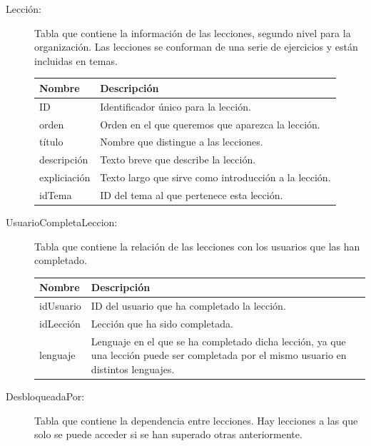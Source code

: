 \begin{description}
\item[Lección:] Tabla que contiene la información de las lecciones, segundo nivel para la organización. Las lecciones se conforman de una serie de ejercicios y están incluidas en temas.

\begin{tabularx}{14cm}{|l|X|}
\hline
\textbf{Nombre} & \textbf{Descripción}                                                              \\ \hline
ID              & Identificador único para la lección.                                         \\ \hline
orden        & Orden en el que queremos que aparezca la lección. \\ \hline
título      & Nombre que distingue a las lecciones. \\ \hline
descripción              & Texto breve que describe la lección.                                         \\ \hline
expliciación        & Texto largo que sirve como introducción a la lección.  \\ \hline
idTema      & ID del tema al que pertenece esta lección. \\ \hline
\end{tabularx}

\item[UsuarioCompletaLeccion:] Tabla que contiene la relación de las lecciones con los usuarios que las han completado.

\begin{tabularx}{14cm}{|l|X|}
\hline
\textbf{Nombre} & \textbf{Descripción}                                                              \\ \hline
idUsuario       & ID del usuario que ha completado la lección.                                                          \\ \hline
idLección     & Lección que ha sido completada.                                           \\ \hline
lenguaje            & Lenguaje en el que se ha completado dicha lección, ya que una lección puede ser completada por el mismo usuario en distintos lenguajes. \\ \hline
\end{tabularx}

\item[DesbloqueadaPor:] Tabla que contiene la dependencia entre lecciones. Hay lecciones a las que solo se puede acceder si se han superado otras anteriormente.


\end{description}

